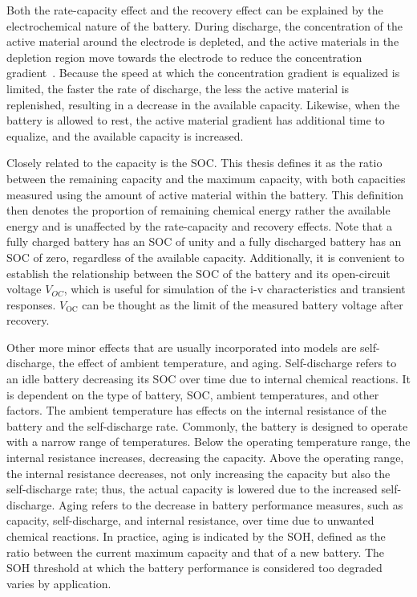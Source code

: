 \documentclass[../zhang_thesis.tex]{subfiles}
\begin{document}
Both the rate-capacity effect and the recovery effect can be explained by the electrochemical nature of the battery. During discharge, the concentration of the active material around the electrode is depleted, and the active materials in the depletion region move towards the electrode to reduce the concentration gradient~\cite{chiasserini99}. Because the speed at which the concentration gradient is equalized is limited, the faster the rate of discharge, the less the active material is
replenished, resulting in a decrease in the available capacity. Likewise, when the battery is allowed to rest, the active material gradient has additional time to equalize, and the available capacity is increased.

Closely related to the capacity is the SOC. This thesis defines it as the ratio between the remaining capacity and the maximum capacity, with both capacities measured using the amount of active material within the battery. This definition then denotes the proportion of remaining chemical energy rather the available energy and is unaffected by the rate-capacity and recovery effects. Note that a fully charged battery has an SOC of unity and a fully discharged battery has an SOC of
zero, regardless of the available capacity. Additionally, it is convenient to establish the relationship between the SOC of the battery and its open-circuit voltage $V_{OC}$, which is useful for simulation of the i-v characteristics and transient responses. $V_\text{OC}$ can be thought as the limit of the measured battery voltage after recovery.

Other more minor effects that are usually incorporated into models are self-discharge, the effect of ambient temperature, and aging. Self-discharge refers to an idle battery decreasing its SOC over time due to internal chemical reactions. It is dependent on the type of battery, SOC, ambient temperatures, and other factors. The ambient temperature has effects on the internal resistance of the battery and the self-discharge rate. Commonly, the battery is designed to operate with a narrow range of temperatures. Below the operating temperature range, the internal resistance increases, decreasing the capacity. Above the operating range, the internal resistance decreases, not only increasing the capacity but also the self-discharge rate; thus, the actual capacity is lowered due to the increased self-discharge. Aging refers to the decrease in battery performance measures, such as capacity, self-discharge, and internal resistance, over time due to unwanted chemical reactions. In practice, aging is indicated by the SOH, defined as the ratio between the current maximum capacity and that of a new battery. The SOH threshold at which the battery performance is considered too degraded varies by application.
\end{document}
